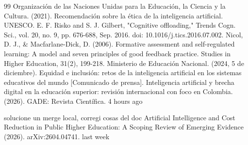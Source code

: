 \documentclass[letterpaper, 10 pt, conference]{ieeeconf}
\begin{document}
\begin{thebibliography}{99}
 Organización de las Naciones Unidas para la Educación, la Ciencia y la Cultura. (2021). Recomendación sobre la ética de la inteligencia artificial. UNESCO. 
 E. F. Risko and S. J. Gilbert, "Cognitive offloading," Trends Cogn. Sci., vol. 20, no. 9, pp. 676-688, Sep. 2016. doi: 10.1016/j.tics.2016.07.002.
 Nicol, D. J., \& Macfarlane-Dick, D. (2006). Formative assessment and self-regulated learning: A model and seven principles of good feedback practice. Studies in Higher Education, 31(2), 199-218.
 Ministerio de Educación Nacional. (2024, 5 de diciembre). Equidad e inclusión: retos de la inteligencia artificial en los sistemas educativos del mundo [Comunicado de prensa].
 Inteligencia artificial y brecha digital en la educación superior: revisión internacional con foco en Colombia. (2026). GADE: Revista Científica.
4 hours ago

solucione un merge local, corregi cosas del doc
 Artificial Intelligence and Cost Reduction in Public Higher Education: A Scoping Review of Emerging Evidence (2026). arXiv:2604.04741. 
last week


\end{thebibliography}
\end{document}
